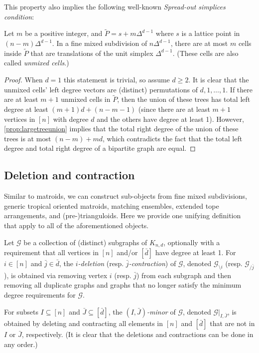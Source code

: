 \documentclass[letterpaper,reqno,11pt]{amsart}
\begin{document}
This property also implies the following well-known \emph{Spread-out simplices condition}:

\begin{corollary}
    Let $m$ be a positive integer, and $\tilde{P} = s + m\Delta^{d-1}$ where $s$ is a lattice point in $(n-m)\Delta^{d-1}$. In a fine mixed subdivision of $n\Delta^{d-1}$, there are at most $m$ cells inside $\tilde{P}$ that are translations of the unit simplex $\Delta^{d-1}$. (These cells are also called \emph{unmixed cells}.)
\end{corollary}

\begin{proof}
    When $d = 1$ this statement is trivial, so assume $d \geq 2$. It is clear that the unmixed cells' left degree vectors are (distinct) permutations of $d, 1, \dots, 1$. If there are at least $m+1$ unmixed cells in $\tilde{P}$, then the union of these trees has total left degree at least $(m+1)d+(n-m-1)$ (since there are at least $m+1$ vertices in $[n]$ with degree $d$ and the others have degree at least 1). However, \cref{prop:largetreeunion} implies that the total right degree of the union of these trees is at most $(n-m)+md$, which contradicts the fact that the total left degree and total right degree of a bipartite graph are equal.
\end{proof}

\subsection{Deletion and contraction}

Similar to matroids, we can construct sub-objects from fine mixed subdivisions, generic tropical oriented matroids, matching ensembles, extended tope arrangements, and (pre-)trianguloids. Here we provide one unifying definition that apply to all of the aforementioned objects.

\begin{definition}
    Let $\mathcal{G}$ be a collection of (distinct) subgraphs of $K_{n, d}$, optionally with a requirement that all vertices in $[n]$ and/or $[\bar{d}]$ have degree at least 1. For $i\in [n]$ and $\bar{j}\in \bar{d}$, the \emph{$i$-deletion} (resp. \emph{$\bar{j}$-contraction}) of $\mathcal{G}$, denoted $\mathcal{G}_{\setminus i}$ (resp. $\mathcal{G}_{/\bar{j}}$), is obtained via removing vertex $i$ (resp. $\bar{j}$) from each subgraph and then removing all duplicate graphs and graphs that no longer satisfy the minimum degree requirements for $\mathcal{G}$.
    
    For subsets $I\subseteq [n]$ and $\bar{J}\subseteq [\bar{d}]$, the \emph{$(I, \bar{J})$-minor} of $\mathcal{G}$, denoted $\mathcal{G}|_{I, \bar{J}}$, is obtained by deleting and contracting all elements in $[n]$ and $[\bar{d}]$ that are not in $I$ or $\bar{J}$, respectively. (It is clear that the deletions and contractions can be done in any order.)
\end{definition}
\end{document}
